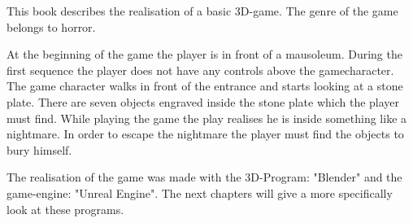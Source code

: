 This book describes the realisation of a basic 3D-game.
The genre of the game belongs to horror.

At the beginning of the game the player is in front of a mausoleum.
During the first sequence the player does not have any controls above the gamecharacter.
The game character walks in front of the entrance and starts looking at a stone plate.
There are seven objects engraved inside the stone plate which the player must find.
While playing the game the play realises he is inside something like a nightmare.
In order to escape the nightmare the player must find the objects to bury himself.

The realisation of the game was made with the 3D-Program: "Blender" and the game-engine: "Unreal Engine".
The next chapters will give a more specifically look at these programs.
